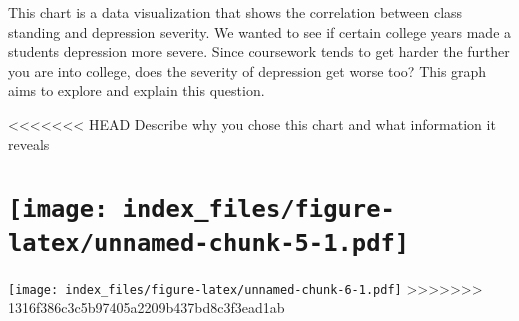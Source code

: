 \documentclass[
]{article}
\begin{document}
This chart is a data visualization that shows the correlation between
class standing and depression severity. We wanted to see if certain
college years made a students depression more severe. Since coursework
tends to get harder the further you are into college, does the severity
of depression get worse too? This graph aims to explore and explain this
question.

\textless\textless\textless\textless\textless\textless\textless{} HEAD
Describe why you chose this chart and what information it reveals

\hypertarget{section}{%
\section[]{\texorpdfstring{\protect\texttt{[image: index\_files/figure-latex/unnamed-chunk-5-1.pdf]}}{}}\label{section}}

\texttt{[image: index\_files/figure-latex/unnamed-chunk-6-1.pdf]}
\textgreater\textgreater\textgreater\textgreater\textgreater\textgreater\textgreater{}
1316f386c3c5b97405a2209b437bd8c3f3ead1ab
\end{document}
